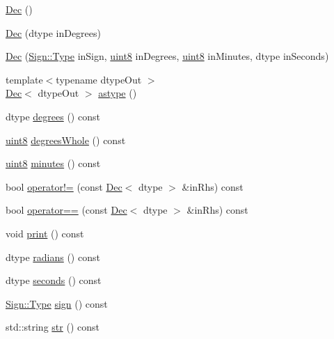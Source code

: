 \begin{DoxyCompactItemize}
\item 
\mbox{\hyperlink{class_num_cpp_1_1_coordinates_1_1_dec_aa32c17eaf9b36b0c1dd2ac1567a823b1}{Dec}} ()
\item 
\mbox{\hyperlink{class_num_cpp_1_1_coordinates_1_1_dec_aab887730681c569abf8a3588ed5adef4}{Dec}} (dtype in\+Degrees)
\item 
\mbox{\hyperlink{class_num_cpp_1_1_coordinates_1_1_dec_a1e26af1eea1f505f32a5761767ef9ed3}{Dec}} (\mbox{\hyperlink{struct_num_cpp_1_1_coordinates_1_1_sign_a6ef8423d5e83675773c2d4f32490e04b}{Sign\+::\+Type}} in\+Sign, \mbox{\hyperlink{namespace_num_cpp_aee396d0469d6031cd18118c0a45bcdda}{uint8}} in\+Degrees, \mbox{\hyperlink{namespace_num_cpp_aee396d0469d6031cd18118c0a45bcdda}{uint8}} in\+Minutes, dtype in\+Seconds)
\item 
{\footnotesize template$<$typename dtype\+Out $>$ }\\\mbox{\hyperlink{class_num_cpp_1_1_coordinates_1_1_dec}{Dec}}$<$ dtype\+Out $>$ \mbox{\hyperlink{class_num_cpp_1_1_coordinates_1_1_dec_aa93345e827c1dcc7e1ffbdaf0ce0639f}{astype}} ()
\item 
dtype \mbox{\hyperlink{class_num_cpp_1_1_coordinates_1_1_dec_a6529988c999d74ce3f59b1479135f9f4}{degrees}} () const
\item 
\mbox{\hyperlink{namespace_num_cpp_aee396d0469d6031cd18118c0a45bcdda}{uint8}} \mbox{\hyperlink{class_num_cpp_1_1_coordinates_1_1_dec_a83b278f99a2774571bbc635a22fd1097}{degrees\+Whole}} () const
\item 
\mbox{\hyperlink{namespace_num_cpp_aee396d0469d6031cd18118c0a45bcdda}{uint8}} \mbox{\hyperlink{class_num_cpp_1_1_coordinates_1_1_dec_ae8ac68a953525869d08d144d2cc68429}{minutes}} () const
\item 
bool \mbox{\hyperlink{class_num_cpp_1_1_coordinates_1_1_dec_a23611ec1f4e09d00de3975fb26c3d9dd}{operator!=}} (const \mbox{\hyperlink{class_num_cpp_1_1_coordinates_1_1_dec}{Dec}}$<$ dtype $>$ \&in\+Rhs) const
\item 
bool \mbox{\hyperlink{class_num_cpp_1_1_coordinates_1_1_dec_a562f803afeaeb1ab2ebacbbfd048fd17}{operator==}} (const \mbox{\hyperlink{class_num_cpp_1_1_coordinates_1_1_dec}{Dec}}$<$ dtype $>$ \&in\+Rhs) const
\item 
void \mbox{\hyperlink{class_num_cpp_1_1_coordinates_1_1_dec_aa11f1fac2dfe2a9341b25d2ee71a9a34}{print}} () const
\item 
dtype \mbox{\hyperlink{class_num_cpp_1_1_coordinates_1_1_dec_ad4bc900f3a4b2a29089a76d72fe04053}{radians}} () const
\item 
dtype \mbox{\hyperlink{class_num_cpp_1_1_coordinates_1_1_dec_a7097ca352bfd8bd25b42f06feeece857}{seconds}} () const
\item 
\mbox{\hyperlink{struct_num_cpp_1_1_coordinates_1_1_sign_a6ef8423d5e83675773c2d4f32490e04b}{Sign\+::\+Type}} \mbox{\hyperlink{class_num_cpp_1_1_coordinates_1_1_dec_a66811b54110025749c34ebfcaf9db8b5}{sign}} () const
\item 
std\+::string \mbox{\hyperlink{class_num_cpp_1_1_coordinates_1_1_dec_a1e98421fc7e41424d706bb507d6813dd}{str}} () const
\end{DoxyCompactItemize}
